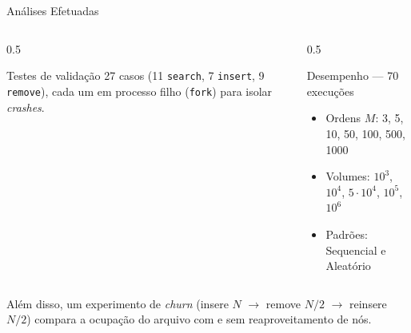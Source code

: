 \documentclass[aspectratio=169,11pt]{beamer}
\begin{document}
\begin{frame}{Análises Efetuadas}
  \begin{columns}[T,onlytextwidth]
    \begin{column}{0.5\textwidth}
      \begin{block}{Testes de validação}
        \footnotesize
        27 casos (11 \texttt{search}, 7 \texttt{insert}, 9 \texttt{remove}),
        cada um em processo filho (\texttt{fork}) para isolar \emph{crashes}.
      \end{block}
    \end{column}
    \begin{column}{0.5\textwidth}
      \begin{block}{Desempenho --- \alert{70 execuções}}
        \footnotesize
        \begin{itemize}
          \item Ordens $M$: 3, 5, 10, 50, 100, 500, 1000
          \item Volumes: $10^3$, $10^4$, $5{\cdot}10^4$, $10^5$, \alert{$10^6$}
          \item Padrões: Sequencial e Aleatório
        \end{itemize}
      \end{block}
    \end{column}
  \end{columns}
  \vspace{0.3em}
  \footnotesize Além disso, um experimento de \emph{churn}
  (insere $N$ $\to$ remove $N/2$ $\to$ reinsere $N/2$) compara a ocupação do
  arquivo \alert{com e sem} reaproveitamento de nós.
\end{frame}
\end{document}
